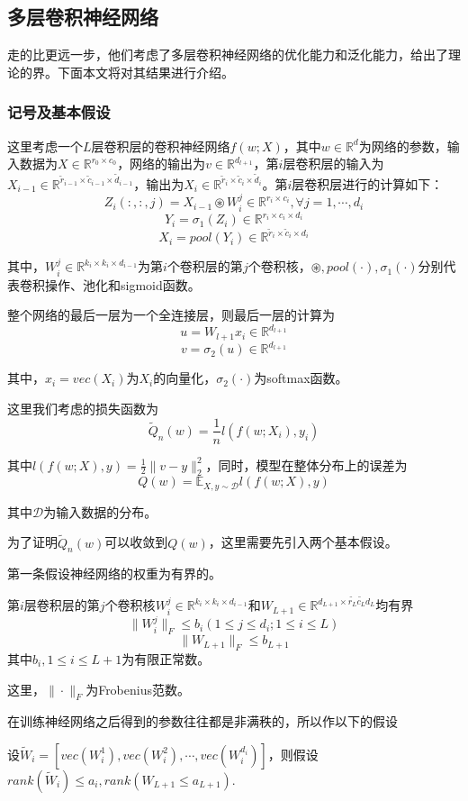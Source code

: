 \subsection{多层卷积神经网络}
\citet{zhou2018understanding}走的比\citet{du2018many}更远一步，他们考虑了多层卷积神经网络的优化能力和泛化能力，给出了理论的界。下面本文将对其结果进行介绍。
\subsubsection{记号及基本假设}
这里考虑一个$L$层卷积层的卷积神经网络$f(w;X)$，其中$w\in \mathbb{R}^d$为网络的参数，输入数据为$X\in \mathbb{R}^{r_0\times c_0}$，网络的输出为$v\in \mathbb{R}^{d_{l+1}}$，第$i$层卷积层的输入为$X_{i-1} \in \mathbb{R}^{\tilde{r}_{i-1}\times \tilde{c}_{i-1}\times \tilde{d}_{i-1}}$，输出为$X_{i} \in \mathbb{R}^{\tilde{r}_{i}\times \tilde{c}_{i}\times \tilde{d}_{i}}$。第$i$层卷积层进行的计算如下：
\[
 Z_i(:,:,j) = X_{i-1}\circledast W_i^j \in \mathbb{R}^{r_i\times c_i}, \forall j=1,\cdots,d_i
\]
\[
Y_i = \sigma_1(Z_i)\in \mathbb{R}^{r_i\times c_i \times d_i}
\]
\[
 X_i = pool(Y_i) \in \mathbb{R}^{\tilde{r}_i\times \tilde{c}_i \times d_i}
\]
\par
其中，$W_i^j \in \mathbb{R}^{k_i\times k_i \times d_{i-1}}$为第$i$个卷积层的第$j$个卷积核，$\circledast, pool(\cdot), \sigma_1(\cdot)$分别代表卷积操作、池化和sigmoid函数。
\par
整个网络的最后一层为一个全连接层，则最后一层的计算为
\[
u = W_{l+1}x_i \in \mathbb{R}^{d_{l+1}}
\]
\[
v = \sigma_2(u) \in \mathbb{R}^{d_{l+1}}
\]
\par
其中，$x_i = vec(X_i)$为$X_i$的向量化，$\sigma_2(\cdot)$为softmax函数。
\par
这里我们考虑的损失函数为
\[
	\tilde{Q}_n(w) = \frac{1}{n} l(f(w;X_i), y_i)
\]
\par
其中$l(f(w;X),y) = \frac{1}{2}\|v-y\|_2^2$，同时，模型在整体分布上的误差为
\[
	Q(w) = \mathbb{E}_{X,y \sim \mathcal{D}} l(f(w;X),y)
\]
\par
其中$\mathcal{D}$为输入数据的分布。
\par
为了证明$\tilde{Q}_n(w)$可以收敛到$Q(w)$，这里需要先引入两个基本假设。
\par
第一条假设神经网络的权重为有界的。
\begin{assumption}
第$i$层卷积层的第$j$个卷积核$W_i^j\in\mathbb{R}^{k_i\times k_i \times d_{i-1}}$和$W_{L+1}\in \mathbb{R}^{d_{L+1}\times \tilde{r_L}\tilde{c_L}d_L}$均有界
\[
\|W_i^j\|_F \leq b_i (1\leq j\leq d_i; 1\leq i \leq L )
\]
\[
\|W_{L+1}\|_F \leq b_{L+1}
\]
其中$b_i, 1\leq i \leq L+1$为有限正常数。
\end{assumption}
\par
这里，$\|\cdot\|_F$为Frobenius范数。
\par
在训练神经网络之后得到的参数往往都是非满秩的，所以作以下的假设
\begin{assumption}
设$\tilde{W}_i = [vec(W_i^1), vec(W_i^2),\cdots, vec(W_i^{d_i})]$，则假设$rank(\tilde{W}_i) \leq a_i, rank(W_{L+1}\leq a_{L+1})$.
\end{assumption}

